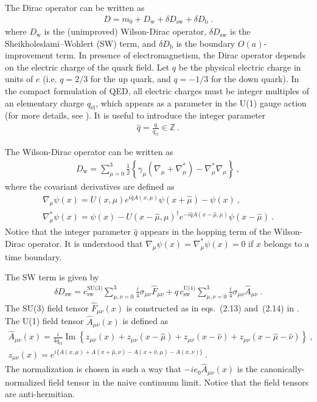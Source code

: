 \documentclass[11pt,fleqn]{article}
\renewcommand{\Im}[0]{\operatorname{Im}}
\begin{document}
The Dirac operator can be written as
\begin{gather}
   D = m_0 + D_\text{w} + \delta D_\text{sw} + \delta D_\text{b}
   \ .
\end{gather}
where $D_\text{w}$ is the (unimproved) Wilson-Dirac operator, $\delta D_\text{sw}$ is the Sheikholeslami–Wohlert (SW) term, and $\delta D_\text{b}$ is the boundary $O(a)$-improvement term. In presence of electromagnetism, the Dirac operator depends on the electric charge of the quark field. Let $q$ be the physical electric charge in units of $e$ (i.e. $q=2/3$ for the up quark, and $q=-1/3$ for the down quark). In the compact formulation of QED, all electric charges must be integer multiples of an elementary charge $q_\text{el}$, which appears as a parameter in the U(1) gauge action (for more details, see \cite{gauge_action}). It is useful to introduce the integer parameter
\begin{gather}
   \hat{q} = \frac{q}{q_\text{el}} \in \mathbb{Z} \ .
\end{gather}

The Wilson-Dirac operator can be written as
\begin{gather}
   D_\text{w}
   =
   \sum_{\mu=0}^3 \frac{1}{2} \left\{ \gamma_\mu ( \nabla_\mu + \nabla^*_\mu ) - \nabla^*_\mu \nabla_\mu \right\}
   \ ,
\end{gather}
where the covariant derivatives are defined as
\begin{gather}
   \nabla_\mu \psi(x) = U(x,\mu) e^{i \hat{q} A(x,\mu)} \psi(x+\hat{\mu}) - \psi(x)
   \ , \\
   \nabla^*_\mu \psi(x) = \psi(x) - U(x-\hat{\mu},\mu)^\dag e^{-i \hat{q} A(x-\hat{\mu},\mu)} \psi(x-\hat{\mu})
   \ .
\end{gather}
Notice that the integer parameter $\hat{q}$ appears in the hopping term of the Wilson-Dirac operator. It is understood that $\nabla_\mu \psi(x) = \nabla^*_\mu \psi(x) = 0$ if $x$ belongs to a time boundary.

The SW term is given by
\begin{gather}
   \delta D_\text{sw}
   =
   c^\text{SU(3)}_\text{sw} \sum_{\mu,\nu=0}^3 \frac{i}{4} \sigma_{\mu\nu} \widehat{F}_{\mu\nu}
   + q \, c^\text{U(1)}_\text{sw} \sum_{\mu,\nu=0}^3 \frac{i}{4} \sigma_{\mu\nu} \widehat{A}_{\mu\nu}
   \ .
\end{gather}
The SU(3) field tensor $\widehat{F}_{\mu\nu}(x)$ is constructed as in eqs.~(2.13) and~(2.14) in \cite{openQCD:dirac}. The U(1) field tensor $\widehat{A}_{\mu\nu}(x)$ is defined as
\begin{gather}
   \hat A_{\mu\nu}(x) = \frac{i}{4 q_\text{el}} \Im\left\{
   z_{\mu\nu}(x)+ 
   z_{\mu\nu}(x-\hat{\mu})+
   z_{\mu\nu}(x-\hat{\nu})+
   z_{\mu\nu}(x-\hat{\mu}-\hat{\nu})
   \right\}
   \ , \\
   z_{\mu\nu}(x) = 
   e^{ i \{ A(x,\mu) + A(x+\hat{\mu},\nu) - A(x+\hat{\nu},\mu) - A(x,\nu) \} }
   \ .
\end{gather}
The normalization is chosen in such a way that $ -i e_0 \hat A_{\mu\nu}(x) $ is the canonically-normalized field tensor in the naive continuum limit. Notice that the field tensors are anti-hermitian.
\end{document}
